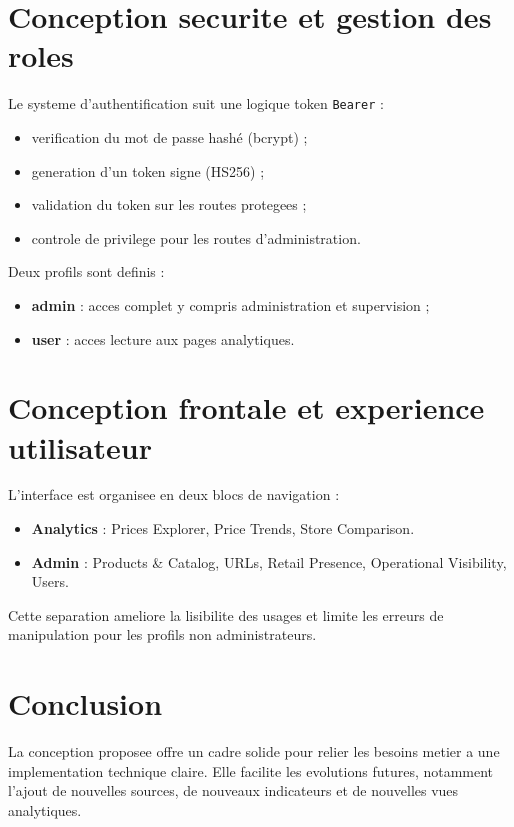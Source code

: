 \section{Conception securite et gestion des roles}
Le systeme d'authentification suit une logique token \texttt{Bearer} :
\begin{itemize}[leftmargin=1.2cm]
	\item verification du mot de passe hashé (bcrypt) ;
	\item generation d'un token signe (HS256) ;
	\item validation du token sur les routes protegees ;
	\item controle de privilege pour les routes d'administration.
\end{itemize}

Deux profils sont definis :
\begin{itemize}[leftmargin=1.2cm]
	\item \textbf{admin} : acces complet y compris administration et supervision ;
	\item \textbf{user} : acces lecture aux pages analytiques.
\end{itemize}

\section{Conception frontale et experience utilisateur}
L'interface est organisee en deux blocs de navigation :
\begin{itemize}[leftmargin=1.2cm]
	\item \textbf{Analytics} : Prices Explorer, Price Trends, Store Comparison.
	\item \textbf{Admin} : Products \& Catalog, URLs, Retail Presence, Operational Visibility, Users.
\end{itemize}

Cette separation ameliore la lisibilite des usages et limite les erreurs de manipulation pour les profils non administrateurs.


\section{Conclusion}
La conception proposee offre un cadre solide pour relier les besoins metier a une implementation technique claire. Elle facilite les evolutions futures, notamment l'ajout de nouvelles sources, de nouveaux indicateurs et de nouvelles vues analytiques.

\clearpage
